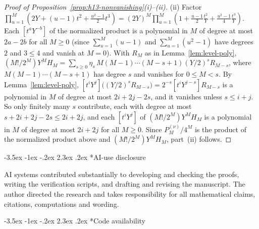 \documentclass[twoside,10pt]{article}
\makeatletter
\numberwithin{equation}{section}
\theoremstyle{slbody}
\theoremstyle{definition}
\theoremstyle{remark}
\renewcommand{\section}{%
  \@startsection{section}{1}{\z@}%
    {-3.5ex \@plus -1ex \@minus -.2ex}%
    {2.3ex \@plus .2ex}%
    {\normalfont\large\bfseries}}
\makeatother
\begin{document}
\begin{proof}[Proof of Proposition~\ref{prop:h13-nonvanishing}(i)--(ii)]
(ii) Factor
\(\prod_{u=1}^M(2Y+(u-1)t^2+\tfrac{u^2-1}{2}t^3)
=(2Y)^M\prod_{u=1}^M(1+\tfrac{u-1}{2}\tfrac{t^2}{Y}+\tfrac{u^2-1}{4}\tfrac{t^3}{Y})\).
Each \([t^aY^{-b}]\) of the normalized product is a polynomial in \(M\) of
degree at most \(2a-2b\) for all \(M\geq0\) (since \(\sum_{u=1}^M(u-1)\) and
\(\sum_{u=1}^M(u^2-1)\) have degrees \(2\) and \(3\leq4\) and vanish at
\(M=0\)).  With \(R_M\) as in Lemma~\ref{lem:level-poly},
\((M!/2^M)Y^MH_M=\sum_{s\geq0}\eta_s\,M(M-1)\cdots(M-s+1)(Y/2)^sR_{M-s}\),
where \(M(M-1)\cdots(M-s+1)\) has degree \(s\) and vanishes for
\(0\leq M<s\).  By Lemma~\ref{lem:level-poly},
\([t^iY^j]\bigl((Y/2)^sR_{M-s}\bigr)=2^{-s}[t^iY^{j-s}]R_{M-s}\) is a
polynomial in \(M\) of degree at most \(2i+2j-2s\), and it vanishes unless
\(s\leq i+j\).  So only finitely many \(s\) contribute, each with degree at
most \(s+2i+2j-2s\leq2i+2j\), and each \([t^iY^j]\) of
\((M!/2^M)Y^MH_M\) is a polynomial in \(M\) of degree at most \(2i+2j\) for
all \(M\geq0\).  Since \(P_M^{(\nu)}/4^M\) is the product of the
normalized product above and \((M!/2^M)Y^MH_M\), part~(ii) follows.
\end{proof}

\section*{AI-use disclosure}

AI systems contributed substantially to developing and checking the
proofs, writing the verification scripts, and drafting and revising the
manuscript. The author directed the research and takes responsibility
for all mathematical claims, citations, computations and wording.

\section*{Code availability}
\end{document}

